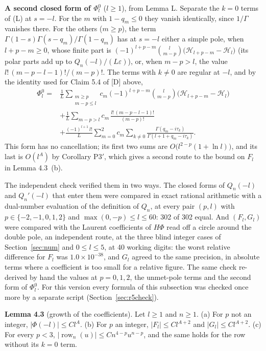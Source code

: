 \documentclass[11pt]{article}
\newcommand{\row}{\operatorname{row}}
\newcommand{\Har}{\mathcal{H}}
\begin{document}
\noindent\textbf{A second closed form of $\Phi^0_l$} ($l\ge1$), from Lemma L. Separate the $k=0$ terms of (L) at $s=-l$. For the $m$ with $1-q_m\le0$ they vanish identically, since $1/\Gamma$ vanishes there. For the others ($m\ge p$), the term $\Gamma(1-s)\Gamma(s-q_m)/\Gamma(1-q_m)$ has at $s=-l$ either a simple pole, when $l+p-m\ge0$, whose finite part is $(-1)^{l+p-m}\binom{l}{m-p}\bigl(\Har_{l+p-m}-\Har_l\bigr)$ (its polar parts add up to $Q_n(-l)/(L\varepsilon)$), or, when $m-p>l$, the value $l!\,(m-p-l-1)!/(m-p)!$. The terms with $k\ne0$ are regular at $-l$, and by the identity used for Claim 5.4 of [D] above,
\begin{align*}
\Phi^0_l={}&\frac1L\sum_{\substack{m\ge p\\ m-p\le l}}c_m(-1)^{l+p-m}\binom{l}{m-p}\bigl(\Har_{l+p-m}-\Har_l\bigr)\\
&+\frac1L\sum_{m-p>l}c_m\,\frac{l!\,(m-p-l-1)!}{(m-p)!}\\
&+\frac{(-1)^{l+1}\,l!}{L}\sum_{m=0}^{2}c_m\sum_{k\ne0}\frac{\Gamma(q_m-i\tau_k)}{\Gamma(l+1+q_m-i\tau_k)}.
\end{align*}
This form has no cancellation; its first two sums are $O\bigl(l^{2-p}(1+\ln l)\bigr)$, and its last is $O(l^A)$ by Corollary P3$'$, which gives a second route to the bound on $F_l$ in Lemma 4.3~(b).

The independent check verified them in two ways. The closed forms of $Q_n(-l)$ and $Q_n'(-l)$ that enter them were compared in exact rational arithmetic with a dual-number evaluation of the definition of $Q_n$, at every pair $(p,l)$ with $p\in\{-2,-1,0,1,2\}$ and $\max(0,-p)\le l\le60$: 302 of 302 equal. And $(F_l,G_l)$ were compared with the Laurent coefficients of $H\Phi$ read off a circle around the double pole, an independent route, at the three blind integer cases of Section~\ref{sec:num} and $0\le l\le5$, at 40 working digits: the worst relative difference for $F_l$ was $1.0\times10^{-38}$, and $G_l$ agreed to the same precision, in absolute terms where a coefficient is too small for a relative figure. The same check re-derived by hand the values at $p=0,1,2$, the unmet-pole terms and the second form of $\Phi^0_l$. For this version every formula of this subsection was checked once more by a separate script (Section~\ref{sec:r5check}).

\medskip
\noindent\textbf{Lemma 4.3} (growth of the coefficients). Let $l\ge1$ and $n\ge1$. (a) For $p$ not an integer, $|\Phi(-l)|\le Cl^A$. (b) For $p$ an integer, $|F_l|\le Cl^{A+2}$ and $|G_l|\le Cl^{A+2}$. (c) For every $p<3$, $|\row_n(u)|\le Cn^{4-p}u^{n-p}$, and the same holds for the row without its $k=0$ term.
\end{document}
